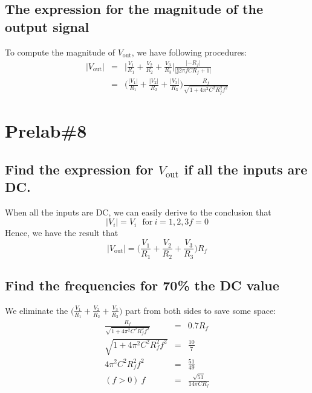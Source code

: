 \documentclass{IEEEtran}
\begin{document}
	\subsection{The expression for the magnitude of the output signal}
	To compute the magnitude of $V_{\mathrm{out}}$, we have following procedures:\\
	\begin{eqnarray}
		|V_{\mathrm{out}}| & = & \bigg|\frac{V_1} {R_1}+\frac {V_2}{R_2}+\frac{V_3}{R_3}\bigg|
		\frac{|-R_f|}{|\mathbf{j}2\pi fCR_f+1|}\\
		& = & \bigg(\frac{|V_1|}{R_1} + \frac{|V_2|}{R_2} + \frac{|V_3|}{R_3}\bigg) \frac{R_f}{\sqrt{1+
		4\pi^2C^2R_f^2f^2}}
	\end{eqnarray}
	\section{\textbf{Prelab\#8}}
	\subsection{Find the expression for $V_{\mathrm{out}}$ if all the inputs are DC.}
	When all the inputs are DC, we can easily derive to the conclusion that\\
	\begin{equation}
		|V_i| = V_i \mathrm{\ \ \ for\ } i = 1,2,3
		f = 0
	\end{equation}
	Hence, we have the result that\\
	\begin{equation}
		|V_{\mathrm{out}}| = \bigg(\frac{V_1}{R_1} + \frac{V_2}{R_2} + \frac{V_3}{R_3}\bigg)R_f
	\end{equation}
	\subsection{Find the frequencies for 70\% the DC value}
	We eliminate the $\bigg(\frac{V_1}{R_1} + \frac{V_2}{R_2} + \frac{V_3}{R_3}\bigg)$ part from both sides to save some space:\\
	\begin{eqnarray}
		 \frac{R_f}{\sqrt{1 + 4\pi^2C^2R_f^2f^2}}& = & 0.7 R_f\\
		\sqrt{1 + 4\pi^2C^2R_f^2f^2} & = & \frac{10}{7}\\
		4\pi^2C^2R_f^2f^2 & = & \frac{51}{49}\\
		(f>0)\ f & = & \frac{\sqrt{51}}{14\pi CR_f}
	\end{eqnarray}
\end{document}

